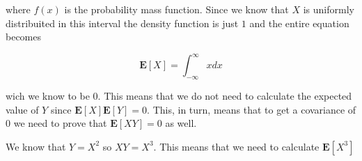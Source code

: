 \documentclass{article}
\begin{document}
where $f(x)$ is the probability mass function. Since we know that $X$ is
uniformly distribuited in this interval the density function is just $1$ and
the entire equation becomes

\begin{equation*}
  \mathbf{E}[X] = \int_{-\infty}^{\infty} x dx
\end{equation*}

wich we know to be $0$. This means that we do not need to calculate the
expected value of $Y$ since $\mathbf{E}[X]\mathbf{E}[Y] = 0$. This, in turn,
means that to get a covariance of $0$ we need to prove that $\mathbf{E}[XY] =
0$ as well.

We know that $Y = X^2$ so $XY = X^3$. This means that we need to calculate
$\mathbf{E}[X^3]$
\end{document}
